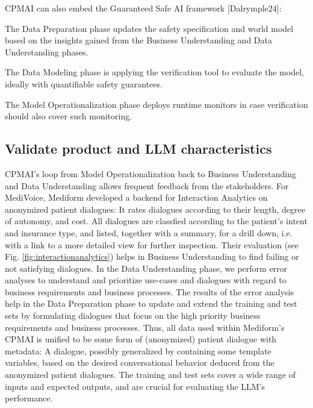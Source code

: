 \documentclass[twocolumn]{article}
\begin{document}
CPMAI can also embed the Guaranteed Safe AI framework [Dalrymple24]:
\begin{compactitem}
\item The Data Preparation phase updates the safety specification and world model based on the insights gained from the Business Understanding and Data Understanding phases.
\item The Data Modeling phase is applying the verification tool to evaluate the model, ideally with quantifiable safety guarantees.
\item The Model Operationalization phase deploys runtime monitors in case verification should also cover such monitoring.
\end{compactitem}

\subsection{Validate product and LLM characteristics}

CPMAI’s loop from Model Operationalization back to Business Understanding and Data Understanding allows frequent feedback from the stakeholders. For MediVoice, Mediform developed a backend for Interaction Analytics on anonymized patient dialogues: It rates dialogues according to their length, degree of autonomy, and cost. All dialogues are classfied according to the patient's intent and insurance type, and listed, together with a summary, for a drill down, i.e. with a link to a more detailed view for further inspection. Their evaluation (see Fig. \ref{fig:interactionanalytics}) helps in Business Understanding to find failing or not satisfying dialogues. In the Data Understanding phase, we perform error analyses to understand and prioritize use-cases and dialogues with regard to business requirements and business processes. The results of the error analysis help in the Data Preparation phase to update and extend the training and test sets by formulating dialogues that focus on the high priority business requirements and business processes. Thus, all data used within Mediform’s CPMAI is unified to be some form of (anonymized) patient dialogue with metadata: A dialogue, possibly generalized by containing some template variables, based on the desired conversational behavior deduced from the anonymized patient dialogues. The training and test sets cover a wide range of inputs and expected outputs, and are crucial for evaluating the LLM’s performance.
\end{document}
